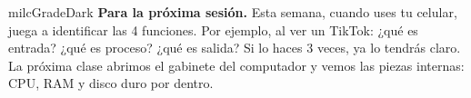 \documentclass[11pt,letterpaper]{article}
\begin{document}
\begin{infoband}{milcGradeDark}
\textbf{Para la próxima sesión.} Esta semana, cuando uses tu celular, juega a identificar las 4 funciones. Por ejemplo, al ver un TikTok: ¿qué es entrada? ¿qué es proceso? ¿qué es salida? Si lo haces 3 veces, ya lo tendrás claro. La próxima clase abrimos el gabinete del computador y vemos las piezas internas: CPU, RAM y disco duro por dentro.
\end{infoband}
\end{document}
